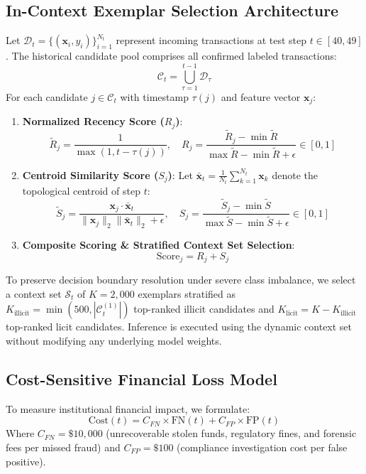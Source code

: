 \documentclass[conference]{IEEEtran}
\begin{document}
\subsection{In-Context Exemplar Selection Architecture}
Let $\mathcal{D}_t = \{(\mathbf{x}_i, y_i)\}_{i=1}^{N_t}$ represent incoming transactions at test step $t \in [40, 49]$. The historical candidate pool comprises all confirmed labeled transactions:
\begin{equation}
\mathcal{C}_t = \bigcup_{\tau=1}^{t-1} \mathcal{D}_\tau
\end{equation}
For each candidate $j \in \mathcal{C}_t$ with timestamp $\tau(j)$ and feature vector $\mathbf{x}_j$:
\begin{enumerate}
    \item \textbf{Normalized Recency Score ($R_j$)}:
    \begin{equation}
    \tilde{R}_j = \frac{1}{\max(1, t - \tau(j))}, \quad R_j = \frac{\tilde{R}_j - \min \tilde{R}}{\max \tilde{R} - \min \tilde{R} + \epsilon} \in [0, 1]
    \end{equation}
    \item \textbf{Centroid Similarity Score ($S_j$)}:
    Let $\bar{\mathbf{x}}_t = \frac{1}{N_t}\sum_{k=1}^{N_t} \mathbf{x}_k$ denote the topological centroid of step $t$:
    \begin{equation}
    \tilde{S}_j = \frac{\mathbf{x}_j \cdot \bar{\mathbf{x}}_t}{\|\mathbf{x}_j\|_2 \|\bar{\mathbf{x}}_t\|_2 + \epsilon}, \quad S_j = \frac{\tilde{S}_j - \min \tilde{S}}{\max \tilde{S} - \min \tilde{S} + \epsilon} \in [0, 1]
    \end{equation}
    \item \textbf{Composite Scoring \& Stratified Context Set Selection}:
    \begin{equation}
    \text{Score}_j = R_j + S_j
    \end{equation}
\end{enumerate}
To preserve decision boundary resolution under severe class imbalance, we select a context set $\mathcal{S}_t$ of $K = 2,000$ exemplars stratified as $K_{\text{illicit}} = \min(500, |\mathcal{C}_t^{(1)}|)$ top-ranked illicit candidates and $K_{\text{licit}} = K - K_{\text{illicit}}$ top-ranked licit candidates. Inference is executed using the dynamic context set without modifying any underlying model weights.

\subsection{Cost-Sensitive Financial Loss Model}
To measure institutional financial impact, we formulate:
\begin{equation}
\text{Cost}(t) = C_{FN} \times \text{FN}(t) + C_{FP} \times \text{FP}(t)
\end{equation}
Where $C_{FN} = \$10,000$ (unrecoverable stolen funds, regulatory fines, and forensic fees per missed fraud) and $C_{FP} = \$100$ (compliance investigation cost per false positive).
\end{document}

